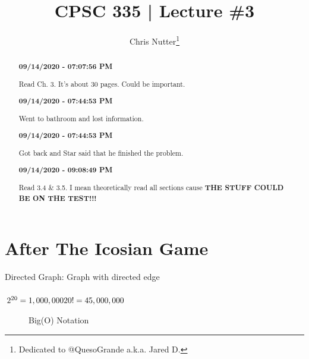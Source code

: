 \documentclass[12pt,a4paper]{article}
\title{CPSC 335 | Lecture \#3}
\author{Chris Nutter\thanks{Dedicated to @QuesoGrande a.k.a. Jared D.}}
\begin{document}
\maketitle

\begin{abstract}
    \noindent
    \begin{center}\textbf{09/14/2020 - 07:07:56 PM}\end{center}
        Read Ch. 3. It's about 30 pages. Could be important.\\
    \begin{center}\textbf{09/14/2020 - 07:44:53 PM}\end{center}
        Went to bathroom and lost information.\\
    \begin{center}\textbf{09/14/2020 - 07:44:53 PM}\end{center}
        Got back and Star said that he finished the problem.\\ 
    \begin{center}\textbf{09/14/2020 - 09:08:49 PM}\end{center}
        Read 3.4 \& 3.5. I mean theoretically read all sections cause \textbf{THE STUFF COULD BE ON THE TEST!!!}\\
\end{abstract}

\tableofcontents    


\section{After The Icosian Game}
    Directed Graph: Graph with directed edge\\\\
    $2^{20} = 1,000,000\\20! = 45,000,000\\$
    \begin{figure}[!hbtp]
        \centering
        \caption{Big(O) Notation}
    \end{figure}
\end{document}
